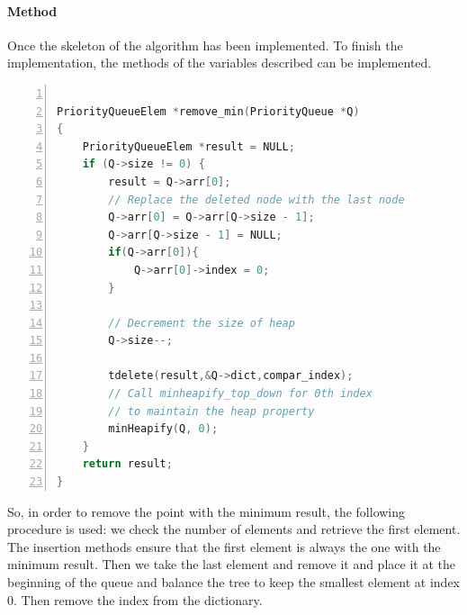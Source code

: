 \paragraph{Method}

Once the skeleton of the algorithm has been implemented. To finish the implementation, the methods of the variables described can be implemented. 

\begin{minipage}{\linewidth}
\begin{lstlisting}[language=C, % Spécifie le langage du code
	caption={PriorityQueue Remove Min}, % Légende du listing
	label=lst:prqueueMethodR_c, % Étiquette pour référencer le listing
	numbers=left,
	numberstyle=\tiny\color{gray},
	stepnumber=1,
	frame=single,
	breaklines=true,
	postbreak=\mbox{\textcolor{red}{$\hookrightarrow$}\space},
	showstringspaces=false
]
	
PriorityQueueElem *remove_min(PriorityQueue *Q)
{
	PriorityQueueElem *result = NULL;
	if (Q->size != 0) {
		result = Q->arr[0];
		// Replace the deleted node with the last node
		Q->arr[0] = Q->arr[Q->size - 1];
		Q->arr[Q->size - 1] = NULL;
		if(Q->arr[0]){
			Q->arr[0]->index = 0;
		}
		
		// Decrement the size of heap
		Q->size--;
		
		tdelete(result,&Q->dict,compar_index);
		// Call minheapify_top_down for 0th index
		// to maintain the heap property
		minHeapify(Q, 0);
	}
	return result;
}
\end{lstlisting}
\end{minipage}
\vspace{1cm}

So, in order to remove the point with the minimum result, the following procedure is used: we check the number of elements and retrieve the first element. The insertion methods ensure that the first element is always the one with the minimum result. Then we take the last element and remove it and place it at the beginning of the queue and balance the tree to keep the smallest element at index 0. Then remove the index from the dictionary. 



